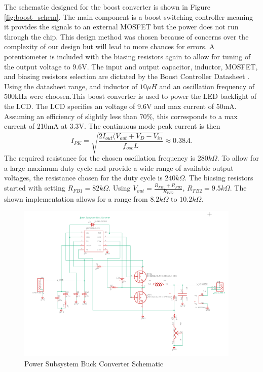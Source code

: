 \documentclass[12pt]{article}
\begin{document}
The schematic designed for the boost converter is shown in Figure \ref{fig:boost_schem}. The main component is a boost switching controller meaning it provides the signals to an external MOSFET but the power does not run through the chip. This design method was chosen because of concerns over the complexity of our design but will lead to more chances for errors. A potentiometer is included with the biasing resistors again to allow for tuning of the output voltage to 9.6V. The input and output capacitor, inductor, MOSFET, and biasing resistors selection are dictated by the Boost Controller Datasheet \cite{boost}. Using the datasheet range, and inductor of $10\mu H$ and an oscillation frequency of 500kHz were choosen.This boost converter is used to power the LED backlight of the LCD. The LCD specifies an voltage of 9.6V and max current of 50mA. Assuming an efficiency of slightly less than 70\%, this corresponds to a max current of 210mA at 3.3V. The continuous mode peak current is then
\[ I_{PK} = \sqrt{\frac{2I_{out}(V_{out} + V_D - V_{in}}{f_{osc}L}} \approx 0.38A. \]
The required resistance for the chosen oscillation frequency is $280k\Omega$. To allow for a large maximum duty cycle and provide a wide range of available output voltages, the resistance chosen for the duty cycle is $240k\Omega$. The biasing resistors started with setting $R_{FB1}=82k\Omega$. Using $V_{out} = \frac{R_{FB1}+R_{FB2}}{R_{FB2}}$, $R_{FB2} = 9.5k\Omega$. The shown implementation allows for a range from $8.2k\Omega$ to $10.2k\Omega$.

\begin{figure}[!h]
	\centering
	\includegraphics[width=0.95\textwidth]{buck_schem.png}
	\caption{Power Subsystem Buck Converter Schematic}
	\label{fig:buck_schem}
\end{figure}
\end{document}
